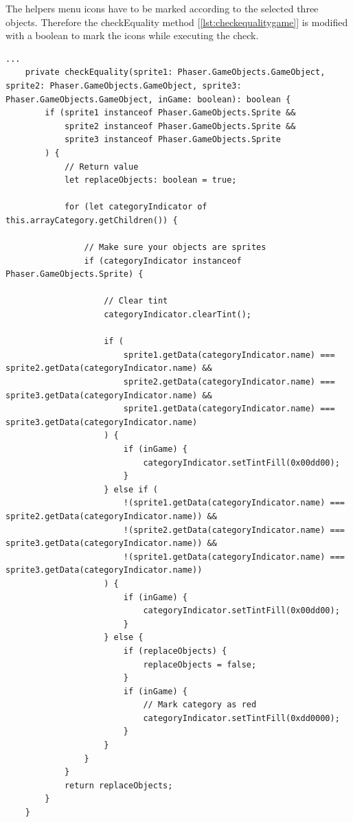The helpers menu icons have to be marked according to the selected three objects.
Therefore the checkEquality method [\ref{lst:checkequalitygame}] is modified with a boolean to mark the icons while executing the check.

\begin{lstlisting}[style=TypeScript, caption={checkEquality (gameScene.ts)}, label={lst:checkequalitygame}]
    ...
    private checkEquality(sprite1: Phaser.GameObjects.GameObject, sprite2: Phaser.GameObjects.GameObject, sprite3: Phaser.GameObjects.GameObject, inGame: boolean): boolean {
        if (sprite1 instanceof Phaser.GameObjects.Sprite &&
            sprite2 instanceof Phaser.GameObjects.Sprite &&
            sprite3 instanceof Phaser.GameObjects.Sprite
        ) {
            // Return value
            let replaceObjects: boolean = true;

            for (let categoryIndicator of this.arrayCategory.getChildren()) {

                // Make sure your objects are sprites
                if (categoryIndicator instanceof Phaser.GameObjects.Sprite) {

                    // Clear tint
                    categoryIndicator.clearTint();

                    if (
                        sprite1.getData(categoryIndicator.name) === sprite2.getData(categoryIndicator.name) &&
                        sprite2.getData(categoryIndicator.name) === sprite3.getData(categoryIndicator.name) &&
                        sprite1.getData(categoryIndicator.name) === sprite3.getData(categoryIndicator.name)
                    ) {
                        if (inGame) {
                            categoryIndicator.setTintFill(0x00dd00);
                        }
                    } else if (
                        !(sprite1.getData(categoryIndicator.name) === sprite2.getData(categoryIndicator.name)) &&
                        !(sprite2.getData(categoryIndicator.name) === sprite3.getData(categoryIndicator.name)) &&
                        !(sprite1.getData(categoryIndicator.name) === sprite3.getData(categoryIndicator.name))
                    ) {
                        if (inGame) {
                            categoryIndicator.setTintFill(0x00dd00);
                        }
                    } else {
                        if (replaceObjects) {
                            replaceObjects = false;
                        }
                        if (inGame) {
                            // Mark category as red
                            categoryIndicator.setTintFill(0xdd0000);
                        }
                    }
                }
            }
            return replaceObjects;
        }
    }
\end{lstlisting}


